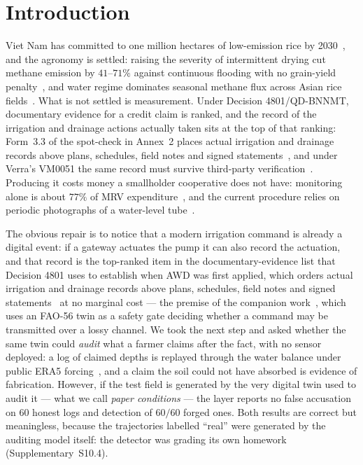 \section{Introduction}
\label{sec:intro}

Viet Nam has committed to one million hectares of low-emission rice by 2030~\cite{qd1490}, and
the agronomy is settled: raising the severity of intermittent drying cut methane
emission by $41$--$71\%$ against continuous flooding with no grain-yield
penalty~\cite{balaine2019}, and water regime dominates seasonal methane flux
across Asian rice fields~\cite{yan2005}. What is not settled is measurement. Under Decision 4801/QD-BNNMT, documentary evidence for a
credit claim is ranked, and the record of the irrigation and drainage actions
actually taken sits at the top of that ranking: Form~3.3 of the spot-check in
Annex~2 places actual irrigation and drainage records above plans, schedules,
field notes and signed statements~\cite{qd4801}, and under Verra's VM0051 the same record must survive
third-party verification~\cite{vm0051}. Producing it costs money a smallholder
cooperative does not have: monitoring alone is about $77\%$ of MRV
expenditure~\cite{jem2026mrv}, and the current procedure relies on periodic
photographs of a water-level tube~\cite{qd4801}.

The obvious repair is to notice that a modern irrigation command is already a
digital event: if a gateway actuates the pump it can also record the actuation,
and that record is the top-ranked item in the documentary-evidence list that Decision 4801 uses to establish when AWD was first applied, which orders actual irrigation and drainage records above plans, schedules, field notes and signed statements~\cite{qd4801} at no marginal cost --- the premise of the companion work~\cite{twingate2026}, which
uses an FAO-56 twin as a safety gate deciding whether a command may be
transmitted over a lossy channel. We took the next step and asked whether the
same twin could \emph{audit} what a farmer claims after the fact, with no
sensor deployed: a log of claimed depths is replayed through the water balance
under public ERA5 forcing~\cite{hersbach2020}, and a claim the soil could not have absorbed is
evidence of fabrication. However, if the test field is generated by the very digital twin used to audit it --- what we call \emph{paper conditions} --- the layer reports no false accusation on $60$ honest logs and detection of $60/60$ forged ones. Both results are correct but meaningless, because the trajectories labelled ``real'' were generated by the auditing model itself: the detector was grading its own homework (Supplementary~S10.4).

